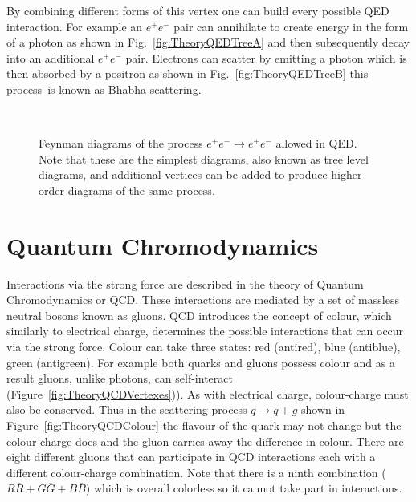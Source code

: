 By combining different forms of this vertex one can build every possible QED interaction. For example an $e^{+}e^{-}$ pair can annihilate to create energy in the form of a photon as shown in Fig.~\ref{fig:TheoryQEDTreeA} and then subsequently decay into an additional $e^{+}e^{-}$ pair. Electrons can scatter by emitting a photon which is then absorbed by a positron as shown in Fig.~\ref{fig:TheoryQEDTreeB} this process is known as Bhabha scattering.

\begin{figure}
  \centering
  \begin{minipage}[][][t]{.47\textwidth}
    \centering
    
     \label{fig:TheoryQEDTreeA}
  \end{minipage}
  \,
  \begin{minipage}[][][t]{.47\textwidth}
    \centering
    
     \label{fig:TheoryQEDTreeB}
  \end{minipage}
  \caption{Feynman diagrams of the process $e^{+}e^{-}\rightarrow e^{+}e^{-}$ allowed in QED. Note that these are the simplest diagrams, also known as tree level diagrams, and additional vertices can be added to produce higher-order diagrams of the same process.}
  \label{fig:TheoryQEDTree}
\end{figure}

\section{Quantum Chromodynamics}

Interactions via the strong force are described in the theory of Quantum Chromodynamics or QCD. These interactions are mediated by a set of massless neutral bosons known as gluons. QCD introduces the concept of colour, which similarly to electrical charge, determines the possible interactions that can occur via the strong force. Colour can take three states: red (antired), blue (antiblue), green (antigreen). For example both quarks and gluons possess colour and as a result gluons, unlike photons, can self-interact (Figure~\ref{fig:TheoryQCDVertexes})). As with electrical charge, colour-charge must also be conserved. Thus in the scattering process $q\rightarrow q+g$ shown in Figure~\ref{fig:TheoryQCDColour} the flavour of the quark may not change but the colour-charge does and the gluon carries away the difference in colour. There are eight different gluons that can participate in QCD interactions each with a different colour-charge combination. Note that there is a ninth combination ($R\overline{R} + G\overline{G}+B\overline{B}$) which is overall colorless so it cannot take part in interactions.


